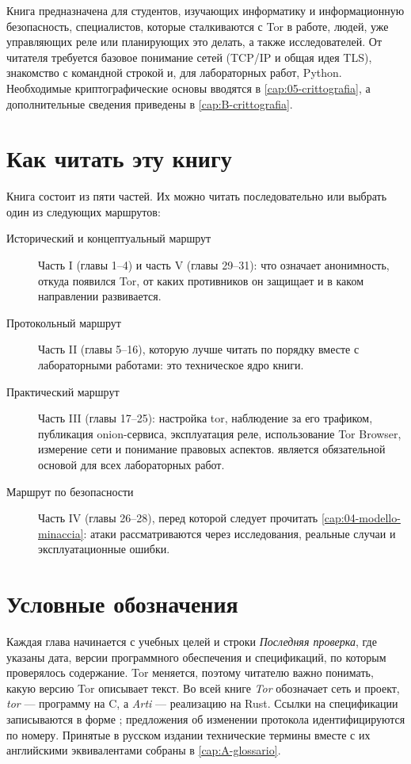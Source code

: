Книга предназначена для студентов, изучающих информатику и информационную безопасность, специалистов, которые сталкиваются с Tor в работе, людей, уже управляющих реле или планирующих это делать, а также исследователей. От читателя требуется базовое понимание сетей (TCP/IP и общая идея TLS), знакомство с командной строкой и, для лабораторных работ, Python. Необходимые криптографические основы вводятся в \cref{cap:05-crittografia}, а дополнительные сведения приведены в \cref{cap:B-crittografia}.

\section*{Как читать эту книгу}

Книга состоит из пяти частей. Их можно читать последовательно или выбрать один из следующих маршрутов:
\begin{description}
  \item[Исторический и концептуальный маршрут] Часть I (главы 1--4) и часть V (главы 29--31): что означает анонимность, откуда появился Tor, от каких противников он защищает и в каком направлении развивается.
  \item[Протокольный маршрут] Часть II (главы 5--16), которую лучше читать по порядку вместе с лабораторными работами: это техническое ядро книги.
  \item[Практический маршрут] Часть III (главы 17--25): настройка tor, наблюдение за его трафиком, публикация onion-сервиса, эксплуатация реле, использование Tor Browser, измерение сети и понимание правовых аспектов.  является обязательной основой для всех лабораторных работ.
  \item[Маршрут по безопасности] Часть IV (главы 26--28), перед которой следует прочитать \cref{cap:04-modello-minaccia}: атаки рассматриваются через исследования, реальные случаи и эксплуатационные ошибки.
\end{description}

\section*{Условные обозначения}

Каждая глава начинается с учебных целей и строки \emph{Последняя проверка}, где указаны дата, версии программного обеспечения и спецификаций, по которым проверялось содержание. Tor меняется, поэтому читателю важно понимать, какую версию Tor описывает текст. Во всей книге \emph{Tor} обозначает сеть и проект, \emph{tor} --- программу на C, а \emph{Arti} --- реализацию на Rust. Ссылки на спецификации записываются в форме ; предложения об изменении протокола идентифицируются по номеру. Принятые в русском издании технические термины вместе с их английскими эквивалентами собраны в \cref{cap:A-glossario}.

